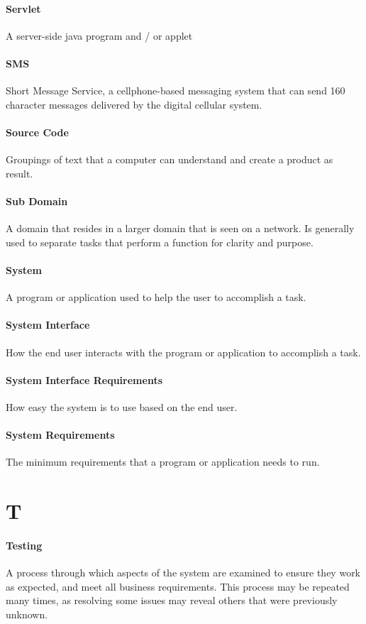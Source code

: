 \documentclass[letterpaper,12pt]{report}
\begin{document}
\paragraph{Servlet} A server-side java program and / or applet
\paragraph{SMS} Short Message Service, a cellphone-based messaging system that can send 160 character messages delivered by the digital cellular system.
\paragraph{Source Code} Groupings of text that a computer can understand and create a product as result.
\paragraph{Sub Domain} A domain that resides in a larger domain that is seen on a network. Is generally used to separate tasks that perform a function for clarity and purpose.
\paragraph{System} A program or application used to help the user to accomplish a task.
\paragraph{System Interface} How the end user interacts with the program or application to accomplish a task.
\paragraph{System Interface Requirements} How easy the system is to use based on the end user.
\paragraph{System Requirements} The minimum requirements that a program or application needs to run.
\section*{T}
\paragraph{Testing} A process through which aspects of the system are examined to ensure they work as expected, and meet all business requirements. This process may be repeated many times, as resolving some issues may reveal others that were previously unknown.
\end{document}
